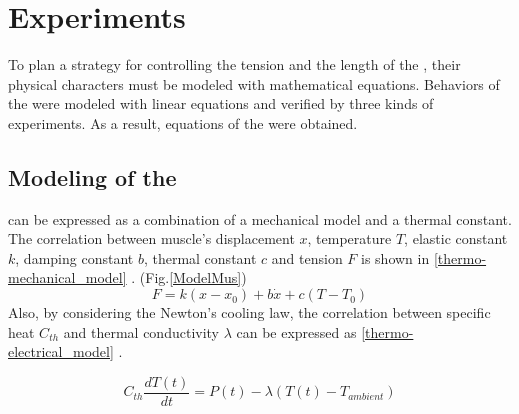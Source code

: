 \section{Experiments}\label{section_modeling}
To plan a strategy for controlling the tension and the length of the \scpsnospace, their physical characters must be modeled with mathematical equations. Behaviors of the \scps were modeled with linear equations and verified by three kinds of experiments. As a result, equations of the \anta were obtained.

\subsection{Modeling of the \ANTA}\label{section_thermo_model}
\scp can be expressed as a combination of a mechanical model and a thermal constant. The correlation between muscle's displacement $x$, temperature $T$, elastic constant $k$, damping constant $b$, thermal constant $c$ and tension $F$ is shown in \eqref{thermo-mechanical_model} \cite{yip}.
(Fig.\ref{ModelMus})
\begin{equation} \label{thermo-mechanical_model}
F=k(x-x_0) + b\dot{x}+c(T-T_0)
\end{equation}
Also, by considering the Newton's cooling law, the correlation between specific heat $C_{th}$ and thermal conductivity $\lambda$ can be expressed as \eqref{thermo-electrical_model} \cite{yip}.

\begin{equation} \label{thermo-electrical_model}
C_{th}\frac{dT(t)}{dt} = P(t) - \lambda(T(t)-T_{ambient})
\end{equation}

